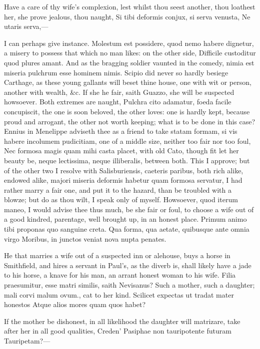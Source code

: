 {Have a care of thy wife's complexion, lest whilst thou seest another,
thou loathest her, she prove jealous, thou naught,
Si tibi deformis conjux, si serva venusta,
Ne utaris serva,---

I can perhaps give instance. Molestum est possidere, quod nemo habere
dignetur, a misery to possess that which no man likes: on the other
side, Difficile custoditur quod plures amant. And as the bragging
soldier vaunted in the comedy, nimia est miseria pulchrum esse hominem
nimis. Scipio did never so hardly besiege Carthage, as these young
gallants will beset thine house, one with wit or person, another with
wealth, \&c. If she he fair, saith Guazzo, she will be suspected
howsoever. Both extremes are naught, Pulchra cito adamatur, foeda
facile concupiscit, the one is soon beloved, the other loves: one is
hardly kept, because proud and arrogant, the other not worth keeping;
what is to be done in this case? Ennius in Menelippe adviseth thee as a
friend to take statam formam, si vis habere incolumem pudicitiam, one
of a middle size, neither too fair nor too foul, Nec formosa
magis quam mihi casta placet, with old Cato, though fit let her beauty
be, neque lectissima, neque illiberalis, between both. This I approve;
but of the other two I resolve with Salisburiensis, caeteris paribus,
both rich alike, endowed alike, majori miseria deformis habetur quam
formosa servatur, I had rather marry a fair one, and put it to the
hazard, than be troubled with a blowze; but do as thou wilt, I speak
only of myself.
Howsoever, quod iterum maneo, I would advise thee thus much, be she
fair or foul, to choose a wife out of a good kindred, parentage, well
brought up, in an honest place.
Primum animo tibi proponas quo sanguine creta.
Qua forma, qua aetate, quibusque ante omnia virgo
Moribus, in junctos veniat nova nupta penates.

He that marries a wife out of a suspected inn or alehouse, buys a horse
in Smithfield, and hires a servant in Paul's, as the diverb is, shall
likely have a jade to his horse, a knave for his man, an arrant honest
woman to his wife. Filia praesumitur, esse matri similis, saith
Nevisanus? Such a mother, such a daughter; mali corvi malum
ovum., cat to her kind.
Scilicet expectas ut tradat mater honestos
Atque alios mores quam quos habet?

If the mother be dishonest, in all likelihood the daughter will
matrizare, take after her in all good qualities,
Creden' Pasiphae non tauripotente futuram
Tauripetam?---

}

